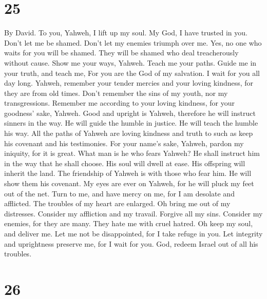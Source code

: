 \hypertarget{section-24}{%
\section{25}\label{section-24}}

By David.  To you, Yahweh, I lift up my soul. 
My God, I have trusted in you. Don't let me be shamed. Don't let my
enemies triumph over me.  Yes, no one who waits for you will
be shamed. They will be shamed who deal treacherously without cause.
 Show me your ways, Yahweh. Teach me your paths.
 Guide me in your truth, and teach me, For you are the God
of my salvation. I wait for you all day long.  Yahweh,
remember your tender mercies and your loving kindness, for they are from
old times.  Don't remember the sins of my youth, nor my
transgressions. Remember me according to your loving kindness, for your
goodness' sake, Yahweh.  Good and upright is Yahweh,
therefore he will instruct sinners in the way.  He will
guide the humble in justice. He will teach the humble his way.
 All the paths of Yahweh are loving kindness and truth to
such as keep his covenant and his testimonies.  For your
name's sake, Yahweh, pardon my iniquity, for it is great. 
What man is he who fears Yahweh? He shall instruct him in the way that
he shall choose.  His soul will dwell at ease. His
offspring will inherit the land.  The friendship of Yahweh
is with those who fear him. He will show them his covenant.
 My eyes are ever on Yahweh, for he will pluck my feet out
of the net.  Turn to me, and have mercy on me, for I am
desolate and afflicted.  The troubles of my heart are
enlarged. Oh bring me out of my distresses.  Consider my
affliction and my travail. Forgive all my sins.  Consider
my enemies, for they are many. They hate me with cruel hatred.
 Oh keep my soul, and deliver me. Let me not be
disappointed, for I take refuge in you.  Let integrity and
uprightness preserve me, for I wait for you.  God, redeem
Israel out of all his troubles.

\hypertarget{section-25}{%
\section{26}\label{section-25}}

